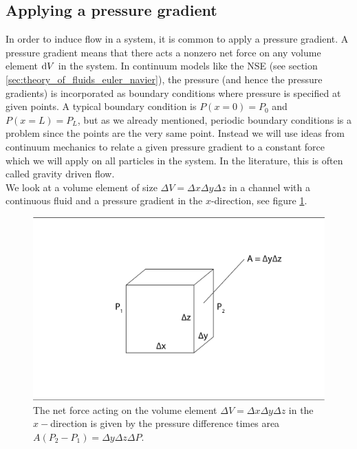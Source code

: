 \subsection{Applying a pressure gradient}
\label{sec:dsmc_applying_pressured_grad}
In order to induce flow in a system, it is common to apply a pressure gradient. A pressure gradient means that there acts a nonzero net force on any volume element $\mathrm{d}V$ in the system. In continuum models like the NSE (see section \ref{sec:theory_of_fluids_euler_navier}), the pressure (and hence the pressure gradients) is incorporated as boundary conditions where pressure is specified at given points. A typical boundary condition is $P(x=0) = P_0$ and $P(x=L) = P_L$, but as we already mentioned, periodic boundary conditions is a problem since the points are the very same point. Instead we will use ideas from continuum mechanics to relate a given pressure gradient to a constant force which we will apply on all particles in the system. In the literature, this is often called gravity driven flow.\\
We look at a volume element of size $\Delta V = \Delta x\Delta y\Delta z$ in a channel with a continuous fluid and a pressure gradient in the $x$-direction, see figure \ref{fig:pressure_gravity_equivalent}. 
\begin{figure}[h]
\begin{center}
\includegraphics[width=\textwidth, trim=0cm 0cm 0cm 0cm, clip]{DSMC/figures/pressure_to_gravity.eps}
\end{center}
\caption{The net force acting on the volume element $\Delta V = \Delta x\Delta y\Delta z$ in the $x-$direction is given by the pressure difference times area $A(P_2 - P_1) = \Delta y\Delta z\Delta P$.}
\label{fig:pressure_gravity_equivalent}
\end{figure}
